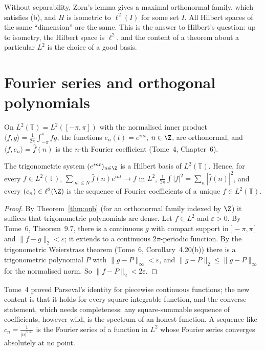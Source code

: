Without separability, Zorn's lemma gives a maximal orthonormal family, which satisfies (b), and $H$ is isometric to $\ell^2(I)$ for some set $I$. All Hilbert spaces of the same ``dimension'' are the same. This is
the answer to Hilbert's question: up to isometry, the Hilbert space is $\ell^2$, and the content of a theorem about a particular $L^2$ is the choice of a good basis.

\section{Fourier series and orthogonal polynomials}

On $L^2(\mathbb T)=L^2([-\pi,\pi])$ with the normalised inner product $\langle f,g\rangle=\frac1{2\pi}\int_{-\pi}^\pi f\overline g$, the functions $e_n(t)=e^{int}$, $n\in\Z$, are orthonormal, and $\langle f,e_n\rangle=\hat f(n)$ is the $n$-th Fourier
coefficient (Tome~4, Chapter~6).

\begin{theorem}\label{thm:fourierl2}
The trigonometric system $(e^{int})_{n\in\Z}$ is a Hilbert basis of $L^2(\mathbb T)$. Hence, for every $f\in L^2(\mathbb T)$, $\sum_{|n|\le N}\hat f(n)e^{int}\to f$ in $L^2$, $\frac1{2\pi}\int|f|^2=\sum_n|\hat f(n)|^2$, and every
$(c_n)\in\ell^2(\Z)$ is the sequence of Fourier coefficients of a unique $f\in L^2(\mathbb T)$.
\end{theorem}
\begin{proof}
By Theorem~\ref{thm:onb} (for an orthonormal family indexed by $\Z$) it suffices that trigonometric polynomials are dense. Let $f\in L^2$ and $\varepsilon>0$. By Tome~6, Theorem~9.7, there is a continuous $g$ with compact support in
$]-\pi,\pi[$ and $\|f-g\|_2<\varepsilon$; it extends to a continuous $2\pi$-periodic function. By the trigonometric Weierstrass theorem (Tome~6, Corollary~4.20(b)) there is a trigonometric polynomial $P$ with
$\|g-P\|_\infty<\varepsilon$, and $\|g-P\|_2\le\|g-P\|_\infty$ for the normalised norm. So $\|f-P\|_2<2\varepsilon$.
\end{proof}

Tome~4 proved Parseval's identity for piecewise continuous functions; the new content is that it holds for every square-integrable function, and the converse statement, which needs completeness: any square-summable sequence of
coefficients, however wild, is the spectrum of an honest function. A sequence like $c_n=\frac1{|n|^{0.51}}$ is the Fourier series of a function in $L^2$ whose Fourier series converges absolutely at no point.

